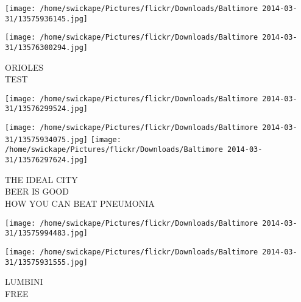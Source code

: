 \documentclass[10pt,letterpaper]{article}
\begin{document}
\texttt{[image: /home/swickape/Pictures/flickr/Downloads/Baltimore 2014-03-31/13575936145.jpg]}

\vspace{0.25in}
\texttt{[image: /home/swickape/Pictures/flickr/Downloads/Baltimore 2014-03-31/13576300294.jpg]}

ORIOLES\\
TEST\\
\pagebreak

\texttt{[image: /home/swickape/Pictures/flickr/Downloads/Baltimore 2014-03-31/13576299524.jpg]}

\vspace{0.25in}
\texttt{[image: /home/swickape/Pictures/flickr/Downloads/Baltimore 2014-03-31/13575934075.jpg]}
\texttt{[image: /home/swickape/Pictures/flickr/Downloads/Baltimore 2014-03-31/13576297624.jpg]}

THE IDEAL CITY\\
BEER IS GOOD\\
HOW YOU CAN BEAT PNEUMONIA\\
\pagebreak

\texttt{[image: /home/swickape/Pictures/flickr/Downloads/Baltimore 2014-03-31/13575994483.jpg]}

\vspace{0.25in}
\texttt{[image: /home/swickape/Pictures/flickr/Downloads/Baltimore 2014-03-31/13575931555.jpg]}

LUMBINI\\
FREE\\
\pagebreak
\end{document}
